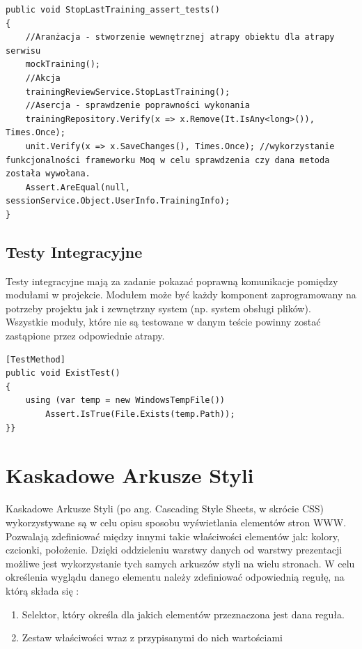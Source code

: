 \begin{lstlisting}[frame=single, numbers=none,captionpos=b, 
caption={Przykładowy test jednostkowy wykorzystujący wzorzec AAA}]
public void StopLastTraining_assert_tests()
{
	//Aranżacja - stworzenie wewnętrznej atrapy obiektu dla atrapy serwisu
	mockTraining();
	//Akcja
	trainingReviewService.StopLastTraining();
	//Asercja - sprawdzenie poprawności wykonania
	trainingRepository.Verify(x => x.Remove(It.IsAny<long>()), Times.Once);
	unit.Verify(x => x.SaveChanges(), Times.Once); //wykorzystanie funkcjonalności frameworku Moq w celu sprawdzenia czy dana metoda została wywołana.
	Assert.AreEqual(null, sessionService.Object.UserInfo.TrainingInfo);
}
\end{lstlisting}

\section{Testy Integracyjne}

Testy integracyjne mają za zadanie pokazać poprawną komunikacje pomiędzy modułami w projekcie. Modułem może być każdy komponent zaprogramowany na potrzeby projektu jak i zewnętrzny system (np. system obsługi plików). Wszystkie moduły, które nie są testowane w danym teście powinny zostać zastąpione przez odpowiednie atrapy.

\begin{lstlisting}[frame=single, numbers=none,captionpos=b, 
caption={Test integracyjny wykorzystany w projekcie.}]
[TestMethod]
public void ExistTest()
{
	using (var temp = new WindowsTempFile())
		Assert.IsTrue(File.Exists(temp.Path));
}}
\end{lstlisting}

\newpage
{\let\cleardoublepage\relax \chapter{Kaskadowe Arkusze Styli}}

Kaskadowe Arkusze Styli (po ang. Cascading Style Sheets, w skrócie CSS)\cite{CSSDoc} wykorzystywane są w celu opisu sposobu wyświetlania elementów stron WWW. Pozwalają zdefiniować między innymi takie właściwości elementów jak: kolory, czcionki, położenie. Dzięki oddzieleniu warstwy danych od warstwy prezentacji możliwe jest wykorzystanie tych samych arkuszów styli na wielu stronach. 
W celu określenia wyglądu danego elementu należy zdefiniować odpowiednią regułę, na którą składa się :
\begin{enumerate}
	\item Selektor, który określa dla jakich elementów przeznaczona jest dana reguła.
	\item Zestaw właściwości wraz z przypisanymi do nich wartościami
\end{enumerate}

